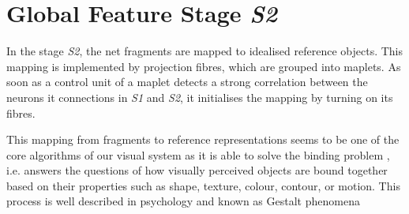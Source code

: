 \section{Global Feature Stage \emph{S2}}
In the stage \emph{S2}, the net fragments are mapped to idealised reference objects.
This mapping is implemented by projection fibres, which are grouped into maplets.
As soon as a control unit of a maplet detects a strong correlation between the neurons it connections in \emph{S1} and \emph{S2}, it initialises the mapping by turning on its fibres.

This mapping from fragments to reference representations seems to be one of the core algorithms of our visual system as it is able to solve the binding problem , i.e. answers the questions of how visually perceived objects are bound together based on their properties such as shape, texture, colour, contour, or motion. This process is well described in psychology and known as Gestalt phenomena \cite{ellis_source_1938, kohler_gestalt_1992, wagemans_century_2012, hamlyn_psychology_2017}


